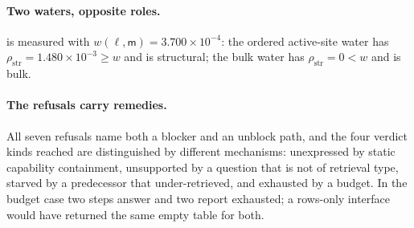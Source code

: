 \documentclass[11pt,twocolumn,a4paper]{article}
\theoremstyle{thmstyle}
\theoremstyle{definition}
\theoremstyle{remark}
\newcommand{\med}{\mathsf{m}}
\newcommand{\vexp}{\textsf{unexpressed}}
\newcommand{\vsurf}{\textsf{unsupported}}
\newcommand{\vstarve}{\textsf{starved}}
\newcommand{\vhaust}{\textsf{exhausted}}
\begin{document}
\paragraph{Two waters, opposite roles.}  is measured with
$w(\ell,\med)=3.700\times10^{-4}$: the ordered active-site water has
$\rho_{\mathrm{str}}=1.480\times10^{-3} \geq w$ and is \textsf{structural};
the bulk water has $\rho_{\mathrm{str}}=0 < w$ and is \textsf{bulk}.

\paragraph{The refusals carry remedies.} All seven refusals name both a
blocker and an unblock path, and the four verdict kinds reached are
distinguished by different mechanisms: \vexp{} by static capability
containment, \vsurf{} by a question that is not of retrieval type,
\vstarve{} by a predecessor that under-retrieved, and \vhaust{} by a budget.
In the budget case two steps answer and two report \vhaust{}; a rows-only
interface would have returned the same empty table for both.
\end{document}
